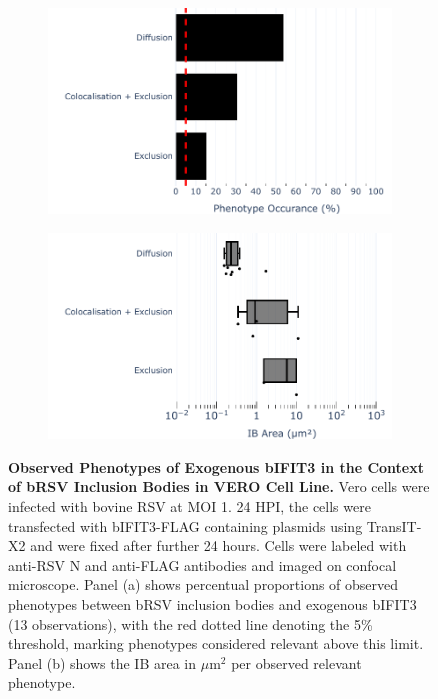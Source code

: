 \begin{figure}
    \begin{subfigure}{0.495\textwidth}
        \caption{}
        \includegraphics[width=1\linewidth]{09. Chapter 4/Figs/02. Overexpression/03. IFIT3/04. bar_i3_brsv.pdf} 
    \end{subfigure}
    \begin{subfigure}{0.495\textwidth}
        \caption{}
        \includegraphics[width=1\linewidth]{09. Chapter 4/Figs/02. Overexpression/03. IFIT3/05. box_i3_brsv.pdf}
    \end{subfigure}
    \caption[Observed Phenotypes of Exogenous bIFIT3 in the Context of bRSV Inclusion Bodies in VERO Cell Line.]{\textbf{Observed Phenotypes of Exogenous bIFIT3 in the Context of bRSV Inclusion Bodies in VERO Cell Line.} Vero cells were infected with bovine RSV at MOI 1. 24 HPI, the cells were transfected with bIFIT3-FLAG containing plasmids using TransIT-X2 and were fixed after further 24 hours. Cells were labeled with anti-RSV N and anti-FLAG antibodies and imaged on confocal microscope. Panel (a) shows percentual proportions of observed phenotypes between bRSV inclusion bodies and exogenous bIFIT3 (13 observations), with the red dotted line denoting the 5\% threshold, marking phenotypes considered relevant above this limit. Panel (b) shows the IB area in \(\mu \mbox{m}^2\) per observed relevant phenotype.}
    \label{fig:Observed Phenotypes of Exogenous bIFIT3 in the Context of bRSV Inclusion Bodies in VERO Cell Line}
\end{figure}

